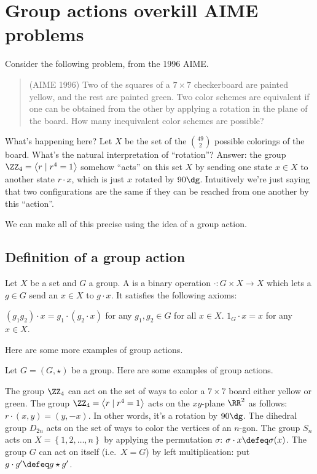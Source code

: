 \chapter{Group actions overkill AIME problems}
Consider the following problem, from the 1996 AIME.

\begin{quote}
	(AIME 1996) Two of the squares of a $7 \times 7$ checkerboard are painted yellow, and the rest are painted green. Two color schemes are equivalent if one can be obtained from the other by applying a rotation in the plane of the board. How many inequivalent color schemes are possible?
\end{quote}

What's happening here? Let $X$ be the set of the $\binom{49}{2}$ possible colorings of the board.
What's the natural interpretation of ``rotation''?
Answer: the group $\Zc 4 = \left<r \mid r^4=1\right>$ somehow ``acts'' on this set $X$ by sending one state $x \in X$ to another state $r \cdot x$, which is just $x$ rotated by $90\dg$.
Intuitively we're just saying that two configurations are the same if they can be reached from one another by this ``action''.

We can make all of this precise using the idea of a group action.

\section{Definition of a group action}

\begin{definition}
	Let $X$ be a set and $G$ a group.
	A  is a binary operation $\cdot : G \times X \to X$
	which lets a $g \in G$ send an $x \in X$ to $g \cdot x$.
	It satisfies the following axioms:
	\begin{itemize}
		\ii $(g_1g_2) \cdot x = g_1 \cdot (g_2 \cdot x)$ for any $g_1, g_2 \in G$
		for all $x \in X$.
		\ii $1_G \cdot x = x$ for any $x \in X$.
	\end{itemize}
\end{definition}

Here are some more examples of group actions.
\begin{example}
	Let $G=(G,\star)$ be a group.
	Here are some examples of group actions.
	\begin{enumerate}[(a)]
		\ii The group $\Zc 4$ can act on the set of ways to color a $7 \times 7$
		board either yellow or green.
		\ii The group $\Zc4 = \left<r \mid r^4=1\right>$ acts on the $xy$-plane $\RR^2$ as follows: $r \cdot (x,y) = (y,-x)$.
		In other words, it's a rotation by $90\dg$.
		\ii The dihedral group $D_{2n}$ acts on the set of ways to color the vertices of an $n$-gon.
		\ii The group $S_n$ acts on $X = \left\{ 1,2,\dots,n \right\}$
		by applying the permutation $\sigma$: $\sigma \cdot x \defeq \sigma(x)$.
		\ii The group $G$ can act on itself (i.e.\ $X=G$) by left multiplication: put $g \cdot g' \defeq g \star g'$.
	\end{enumerate}
\end{example}

